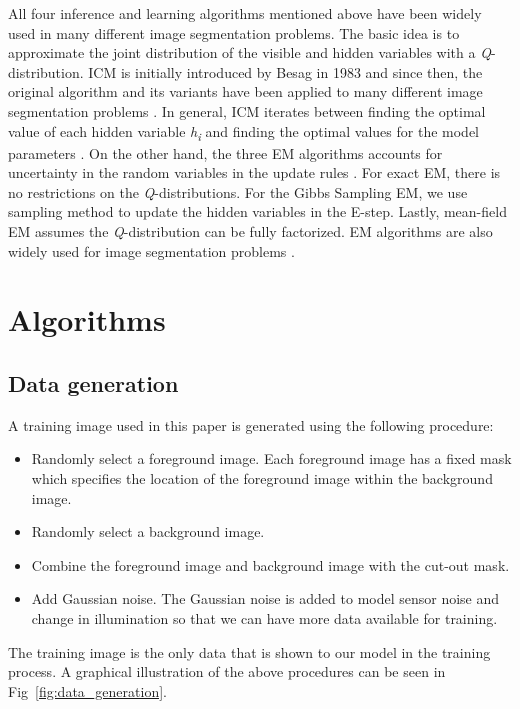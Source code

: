 \documentclass{article} %
\begin{document}
All four inference and learning algorithms mentioned above have been widely used in many different image segmentation problems. The basic idea is to approximate the joint distribution of the visible and hidden variables with a \textit{Q}-distribution. ICM is initially introduced by Besag in 1983 \cite{b3} and since then, the original algorithm and its variants have been applied to many different image segmentation problems \cite{b4} \cite{b5} \cite{b6}. In general, ICM iterates between finding the optimal value of each hidden variable \textit{h}\textsubscript{\textit{i}} and finding the optimal values for the model parameters \cite{b2}. On the other hand, the three EM algorithms accounts for uncertainty in the random variables in the update rules \cite{b2}. For exact EM, there is no restrictions on the \textit{Q}-distributions. For the Gibbs Sampling EM, we use sampling method to update the hidden variables in the E-step. Lastly, mean-field EM assumes the \textit{Q}-distribution can be fully factorized. EM algorithms are also widely used for image segmentation problems \cite{b7} \cite{b8} \cite{b9} \cite{b10}.

\section{Algorithms}
\label{alog}
\subsection{Data generation}
\label{data_gen}
A training image used in this paper is generated using the following procedure:
\begin{itemize}

\item Randomly select a foreground image. Each foreground image has a fixed mask which specifies the location of the foreground image within the background image.

\item Randomly select a background image.

\item Combine the foreground image and background image with the cut-out mask.

\item Add Gaussian noise. The Gaussian noise is added to model sensor noise and change in illumination so that we can have more data available for training. 
\end{itemize}

The training image is the only data that is shown to our model in the training process. A graphical illustration of the above procedures can be seen in Fig~\ref{fig:data_generation}.
\end{document}
